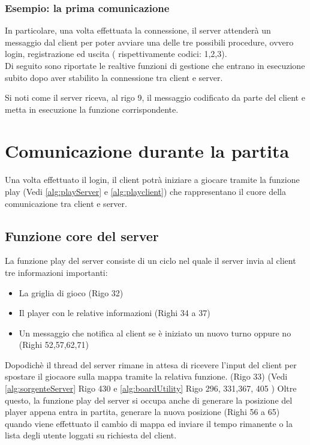 \documentclass[a4paper]{article}
\begin{document}
 \subsubsection{Esempio: la prima comunicazione}
 In particolare, una volta effettuata la connessione,
il server attenderà un messaggio dal client per poter avviare una delle tre possibili procedure, ovvero login, registrazione ed uscita ( rispettivamente codici: 1,2,3).\\
Di seguito sono riportate le realtive funzioni di gestione che entrano in esecuzione subito dopo aver stabilito la connessione
tra client e server.

Si noti come il server riceva, al rigo 9, il messaggio codificato da parte del client e metta in esecuzione la funzione corrispondente.

\pagebreak
\section{Comunicazione durante la partita}
\paragraph{}
Una volta effettuato il login, il client potrà iniziare a giocare tramite la funzione play (Vedi \autoref{alg:playServer} e \autoref{alg:playclient})
che rappresentano il cuore della comunicazione tra client e server.
\subsection{Funzione core del server}
La funzione play del server consiste di un ciclo nel quale il server invia al client tre informazioni importanti:
\begin{itemize}
  \setlength\itemsep{0.2mm}
  \item La griglia di gioco (Rigo 32)
  \item Il player con le relative informazioni (Righi 34 a 37)
  \item Un messaggio che notifica al client se è iniziato un nuovo turno oppure no (Righi 52,57,62,71)
\end{itemize}
Dopodichè il thread del server rimane in attesa di ricevere l'input del client per spostare il giocaore sulla mappa tramite la relativa funzione. (Rigo 33) (Vedi \autoref{alg:sorgenteServer} Rigo 430 e \autoref{alg:boardUtility} Rigo 296, 331,367, 405 )
Oltre questo, la funzione play del server si occupa anche di generare la posizione del player appena entra in partita, generare la nuova posizione  (Righi 56 a 65) quando viene effettuato il cambio di mappa ed inviare il tempo rimanente o la lista degli utente loggati su richiesta del client. 
\end{document}
